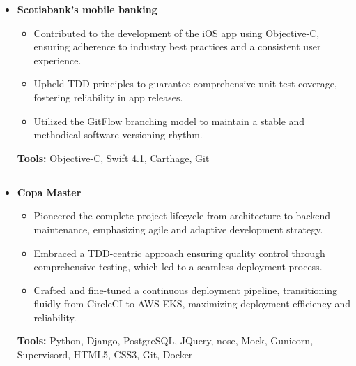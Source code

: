 \documentclass[11pt,a4paper,english]{moderncv}
\begin{document}
{\begin{itemize}
\begin{itemize}
        \end{itemize}
        \textbf{Tools:} Python, asyncio, Flask, SQLAlchemy, MySQL, MongoDB, Mock, Git, Docker
    \item \textbf{Scotiabank's mobile banking}
        \begin{itemize}
            \item Contributed to the development of the iOS app using Objective-C, ensuring adherence to industry best practices and a consistent user experience.
            \item Upheld TDD principles to guarantee comprehensive unit test coverage, fostering reliability in app releases.
            \item Utilized the GitFlow branching model to maintain a stable and methodical software versioning rhythm.
        \end{itemize}
        \textbf{Tools:} Objective-C, Swift 4.1, Carthage, Git
\end{itemize}
}

\subsection{}

{
\begin{itemize}
    \item \textbf{Copa Master}
        \begin{itemize}
            \item Pioneered the complete project lifecycle from architecture to backend maintenance, emphasizing agile and adaptive development strategy.
            \item Embraced a TDD-centric approach ensuring quality control through comprehensive testing, which led to a seamless deployment process.
            \item Crafted and fine-tuned a continuous deployment pipeline, transitioning fluidly from CircleCI to AWS EKS, maximizing deployment efficiency and reliability.
        \end{itemize}
        \textbf{Tools:} Python, Django, PostgreSQL, JQuery, nose, Mock, Gunicorn, Supervisord, HTML5, CSS3, Git, Docker
\end{itemize}
}

\subsection{}
\end{document}
